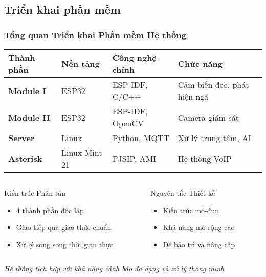\subsection{Triển khai phần mềm}
\begin{frame}
\frametitle{Tổng quan Triển khai Phần mềm Hệ thống}

\begin{table}[htbp]
\centering
\small
\begin{tabular}{|l|l|l|l|}
\hline
\textbf{Thành phần} & \textbf{Nền tảng} & \textbf{Công nghệ chính} & \textbf{Chức năng} \\
\hline
\textbf{Module I} & ESP32 & ESP-IDF, C/C++ & Cảm biến đeo, phát hiện ngã \\
\hline
\textbf{Module II} & ESP32 & ESP-IDF, OpenCV & Camera giám sát \\
\hline
\textbf{Server} & Linux & Python, MQTT & Xử lý trung tâm, AI \\
\hline
\textbf{Asterisk} & Linux Mint 21 & PJSIP, AMI & Hệ thống VoIP \\
\hline
\end{tabular}
\end{table}

\vspace{0.3cm}

\begin{columns}[t]
\begin{column}{0.48\textwidth}
\begin{block}{Kiến trúc Phân tán}
\begin{itemize}
\item 4 thành phần độc lập
\item Giao tiếp qua giao thức chuẩn
\item Xử lý song song thời gian thực
\end{itemize}
\end{block}
\end{column}

\begin{column}{0.48\textwidth}
\begin{alertblock}{Nguyên tắc Thiết kế}
\begin{itemize}
\item Kiến trúc mô-đun
\item Khả năng mở rộng cao
\item Dễ bảo trì và nâng cấp
\end{itemize}
\end{alertblock}
\end{column}
\end{columns}

\vspace{0.3cm}
\begin{center}
\textit{\small Hệ thống tích hợp với khả năng cảnh báo đa dạng và xử lý thông minh}
\end{center}

\end{frame}
